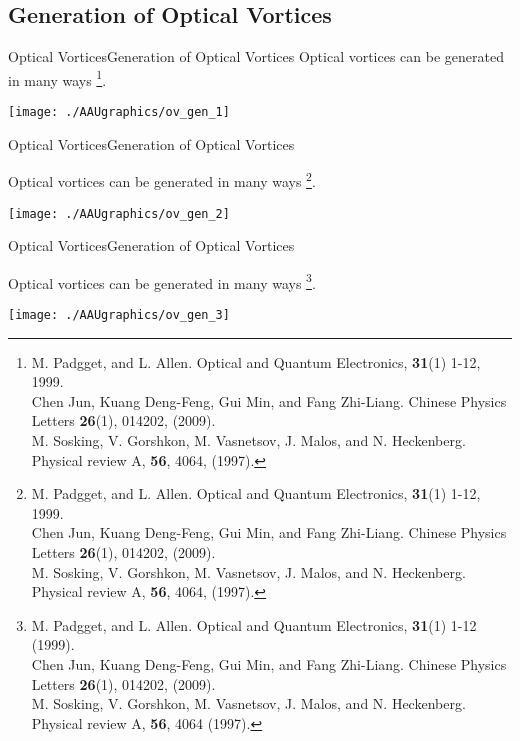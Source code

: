 \documentclass[10pt]{beamer}
\begin{document}
\subsection{Generation of Optical Vortices}
\begin{frame}{Optical Vortices}{Generation of Optical Vortices}
Optical vortices can be generated in many ways \footnote{\scriptsize M. Padgget, and L. Allen. Optical and Quantum Electronics, \textbf{31}(1) 1-12, 1999. \\
Chen Jun, Kuang Deng-Feng, Gui Min, and Fang Zhi-Liang. Chinese Physics Letters \textbf{26}(1), 014202, (2009).\\
M. Sosking, V. Gorshkon, M. Vasnetsov, J. Malos, and N. Heckenberg. Physical review A, \textbf{56}, 4064, (1997).}.

\vspace{20pt}

\texttt{[image: ./AAUgraphics/ov\_gen\_1]}
\end{frame}

\begin{frame}{Optical Vortices}{Generation of Optical Vortices}
\addtocounter{framenumber}{-1}
Optical vortices can be generated in many ways \footnote[2]{\scriptsize M. Padgget, and L. Allen. Optical and Quantum Electronics, \textbf{31}(1) 1-12, 1999. \\
Chen Jun, Kuang Deng-Feng, Gui Min, and Fang Zhi-Liang. Chinese Physics Letters \textbf{26}(1), 014202, (2009).\\
M. Sosking, V. Gorshkon, M. Vasnetsov, J. Malos, and N. Heckenberg. Physical review A, \textbf{56}, 4064, (1997).}.

\vspace{20pt}

\texttt{[image: ./AAUgraphics/ov\_gen\_2]}
\end{frame}

\begin{frame}{Optical Vortices}{Generation of Optical Vortices}
\addtocounter{framenumber}{-1}
Optical vortices can be generated in many ways \footnote[2]{\scriptsize M. Padgget, and L. Allen. Optical and Quantum Electronics, \textbf{31}(1) 1-12 (1999). \\
Chen Jun, Kuang Deng-Feng, Gui Min, and Fang Zhi-Liang. Chinese Physics Letters \textbf{26}(1), 014202, (2009).\\
M. Sosking, V. Gorshkon, M. Vasnetsov, J. Malos, and N. Heckenberg. Physical review A, \textbf{56}, 4064 (1997).}.

\vspace{20pt}

\texttt{[image: ./AAUgraphics/ov\_gen\_3]}
\end{frame}
\end{document}
